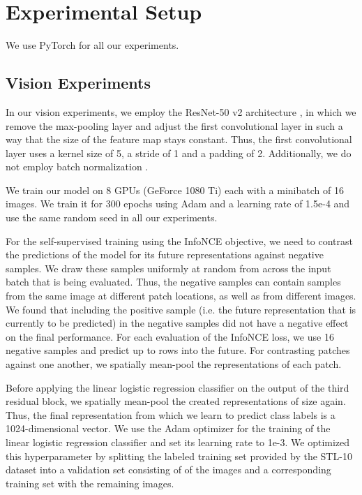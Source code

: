 \documentclass{article}
\begin{document}



\newpage
\appendix
\section{Experimental Setup}

We use PyTorch \citep{paszke2017automatic} for all our experiments.


\subsection{Vision Experiments}
\label{app:vision}
In our vision experiments, we employ the ResNet-50 v2 architecture \citep{he2016identity}, in which we remove the max-pooling layer and adjust the first convolutional layer in such a way that the size of the feature map stays constant. Thus, the first convolutional layer uses a kernel size of 5, a stride of 1 and a padding of 2. Additionally, we do not employ batch normalization \citep{ioffe2015batch}.

We train our model on 8 GPUs (GeForce 1080 Ti) each with a minibatch of 16 images. We train it for 300 epochs using Adam \citep{kingma2014adam} and a learning rate of 1.5e-4 and use the same random seed in all our experiments.

For the self-supervised training using the InfoNCE objective, we need to contrast the predictions of the model for its future representations against negative samples. We draw these samples uniformly at random from across the input batch that is being evaluated. Thus, the negative samples can contain samples from the same image at different patch locations, as well as from different images. We found that including the positive sample (i.e. the future representation that is currently to be predicted) in the negative samples did not have a negative effect on the final performance. For each evaluation of the InfoNCE loss, we use 16 negative samples and predict up to  rows into the future. For contrasting patches against one another, we spatially mean-pool the representations of each patch.

Before applying the linear logistic regression classifier on the output of the third residual block, we spatially mean-pool the created representations of size  again. Thus, the final representation from which we learn to predict class labels is a 1024-dimensional vector. We use the Adam optimizer for the training of the linear logistic regression classifier and set its learning rate to 1e-3. We optimized this hyperparameter by splitting the labeled training set provided by the STL-10 dataset into a validation set consisting of  of the images and a corresponding training set with the remaining images.
\end{document}
